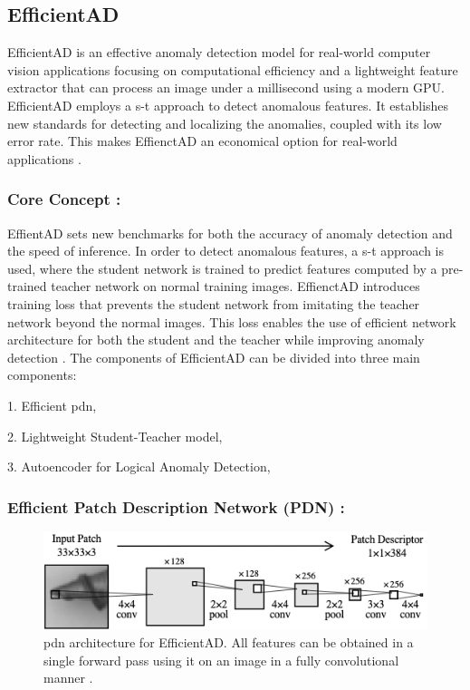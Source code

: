 \subsection{EfficientAD}
\label{subsec:efficientad}

EfficientAD is an effective anomaly detection model for real-world computer vision applications focusing on computational efficiency and a lightweight feature extractor that can process an image under a millisecond using a modern GPU. EfficientAD employs a \gls{s-t} approach to detect anomalous features. It establishes new standards for detecting and localizing the anomalies, coupled with its low error rate. This makes EffienctAD an economical option for real-world applications \cite{batzner2024efficientadaccuratevisualanomaly}.

\subsubsection*{Core Concept :}

EffientAD sets new benchmarks for both the accuracy of anomaly detection and the speed of inference. In order to detect anomalous features, a \gls{s-t} approach is used, where the student network is trained to predict features computed by a pre-trained teacher network on normal training images. EffienctAD introduces training loss that prevents the student network from imitating the teacher network beyond the normal images. This loss enables the use of efficient network architecture for both the student and the teacher while improving anomaly detection \cite{batzner2024efficientadaccuratevisualanomaly}. The components of EfficientAD can be divided into three main components:

1. Efficient \gls{pdn},

2. Lightweight Student-Teacher model,

3. Autoencoder for Logical Anomaly Detection,

\subsubsection*{Efficient Patch Description Network (PDN) :}

\begin{figure}[ht!]
    \centering
    \includegraphics[width=1.1\linewidth]{Rohit_Master_Thesis//Images/pdn.png}
    \caption{\gls{pdn} architecture for EfficientAD. All features can be obtained in a single forward pass using it on an image in a fully convolutional manner \cite{batzner2024efficientadaccuratevisualanomaly}.}
    \label{fig:pdn architecture}
\end{figure}

